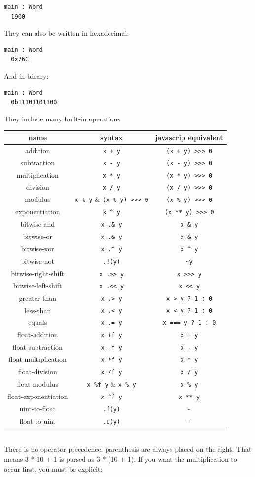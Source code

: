 \documentclass{article}
\theoremstyle{definition}
\theoremstyle{theorem}
\begin{document}
\begin{lstlisting}
main : Word
  1900
\end{lstlisting}

They can also be written in hexadecimal:

\begin{lstlisting}
main : Word
  0x76C
\end{lstlisting}

And in binary:

\begin{lstlisting}
main : Word
  0b11101101100
\end{lstlisting}

They include many built-in operations:

\begin{tabular}{ c | c | c}
name & syntax & javascrip equivalent \\\hline
addition & \verb|x + y| & \verb|(x + y) >>> 0|\\
subtraction & \verb|x - y| & \verb|(x - y) >>> 0|\\
multiplication & \verb|x * y| & \verb|(x * y) >>> 0|\\
division & \verb|x / y| & \verb|(x / y) >>> 0|\\
modulus & \verb|x % y| & \verb|(x % y) >>> 0|\\
exponentiation & \verb|x ^ y| & \verb|(x ** y) >>> 0|\\
bitwise-and & \verb|x .& y| & \verb|x & y|\\
bitwise-or & \verb|x .& y| & \verb|x & y|\\
bitwise-xor & \verb|x .^ y| & \verb|x ^ y|\\
bitwise-not & \verb|.!(y)| & \verb|~y|\\
bitwise-right-shift & \verb|x .>> y| & \verb|x >>> y|\\
bitwise-left-shift & \verb|x .<< y| & \verb|x << y|\\
greater-than & \verb|x .> y| & \verb|x > y ? 1 : 0|\\
less-than & \verb|x .< y| & \verb|x < y ? 1 : 0|\\
equals & \verb|x .= y| & \verb|x === y ? 1 : 0|\\
float-addition & \verb|x +f y| & \verb|x + y|\\
float-subtraction & \verb|x -f y| & \verb|x - y|\\
float-multiplication & \verb|x *f y| & \verb|x * y|\\
float-division & \verb|x /f y| & \verb|x / y|\\
float-modulus & \verb|x %f y| & \verb|x % y|\\
float-exponentiation & \verb|x ^f y| & \verb|x ** y|\\
uint-to-float & \verb|.f(y)| & -\\
float-to-uint & \verb|.u(y)| & -\\
\end{tabular}
\\
\hfill
\newline
There is no operator precedence: parenthesis are always placed on the right.
That means 3 * 10 + 1 is parsed as 3 * (10 + 1). If you want the multiplication
to occur first, you must be explicit:
\end{document}
